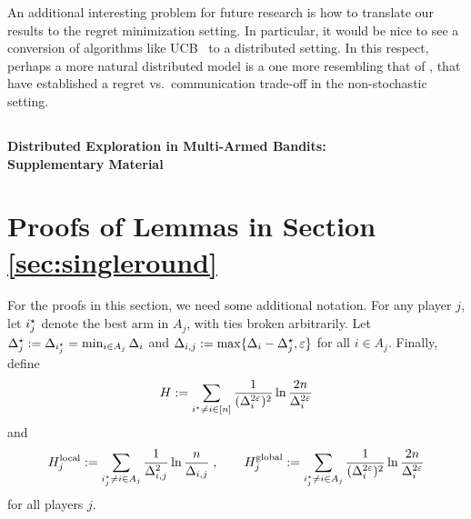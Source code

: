 \documentclass{article} %
\begin{document}
An additional interesting problem for future research is how to translate our results to the regret minimization setting.
In particular, it would be nice to see a conversion of algorithms like UCB~\cite{auer2002finite} to a distributed setting.
In this respect, perhaps a more natural distributed model is a one more resembling that of \citet{kanade2012distributed}, that have established a regret vs.~communication trade-off in the non-stochastic setting.





%




\ifdefined\isconf
\else

\newpage
{} %
\appendix

\begin{center}
\section*{}
{\Large\bf Distributed Exploration in Multi-Armed Bandits:} \\
{\large\bf Supplementary Material}
\end{center}


\section{Proofs of Lemmas in Section \ref{sec:singleround}}

For the proofs in this section, we need some additional notation.
For any player $j$, let $i^\star_j$ denote the best arm in $A_j$, with ties broken arbitrarily. 
Let $\Delta^\star_j := \Delta_{i^\star_j} = \min_{i \in A_j} \Delta_i$ and $\Delta_{i,j} := \max\{ \Delta_i - \Delta_j^\star, \varepsilon \}$ for all $i \in A_j$.
Finally, define
\begin{align*}
	H
	:= \sum_{i^\star \ne i \in [n]}
		\frac{1}{(\Delta_i^{2\varepsilon})^2} \ln \frac{2n}{\Delta_i^{2\varepsilon}}
\end{align*}
and
\begin{align*}
	H_j^{\text{local}}
	:= \sum_{i^\star_j \ne i \in A_j}
		\frac{1}{\Delta_{i,j}^2} \ln \frac{n}{\Delta_{i,j}}
	\;,\qquad
	H_j^{\text{global}}
	:= \sum_{i^\star_j \ne i \in A_j}
		\frac{1}{(\Delta_i^{2\varepsilon})^2} \ln \frac{2n}{\Delta_i^{2\varepsilon}}
\end{align*}
for all players $j$.
\end{document}
